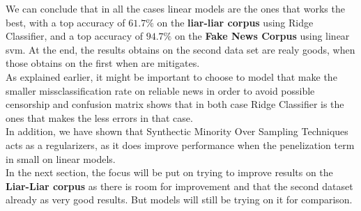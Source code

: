We can conclude that in all the cases linear models are the ones that works the best, with a top accuracy of $61.7\%$ on the \textbf{liar-liar corpus} using Ridge Classifier, and a top accuracy of $94.7\%$ on the \textbf{Fake News Corpus} using linear svm. At the end, the results obtains on the second data set are realy goods, when those obtains on the first when are mitigates. \\

As explained earlier, it might be important to choose to model that make the smaller missclassification rate on reliable news in order to avoid possible censorship and confusion matrix shows that in both case Ridge Classifier is the ones that makes the less errors in that case. \\

In addition, we have shown that Synthectic Minority Over Sampling Techniques acts as a regularizers, as it does improve performance when the penelization term in small on linear models. \\

In the next section, the focus will be put on trying to improve results on the \textbf{Liar-Liar corpus} as there is room for improvement and that the second dataset already as very good results. But models will still be trying on it for comparison. 
